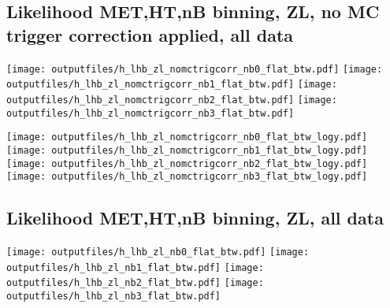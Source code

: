 \documentclass[11pt]{article}
\begin{document}



    \subsection{ Likelihood MET,HT,nB binning, ZL, no MC trigger correction applied, all data}

    \noindent
     \texttt{[image: outputfiles/h\_lhb\_zl\_nomctrigcorr\_nb0\_flat\_btw.pdf]}
     \texttt{[image: outputfiles/h\_lhb\_zl\_nomctrigcorr\_nb1\_flat\_btw.pdf]}
     \texttt{[image: outputfiles/h\_lhb\_zl\_nomctrigcorr\_nb2\_flat\_btw.pdf]}
     \texttt{[image: outputfiles/h\_lhb\_zl\_nomctrigcorr\_nb3\_flat\_btw.pdf]}

    \noindent
     \texttt{[image: outputfiles/h\_lhb\_zl\_nomctrigcorr\_nb0\_flat\_btw\_logy.pdf]}
     \texttt{[image: outputfiles/h\_lhb\_zl\_nomctrigcorr\_nb1\_flat\_btw\_logy.pdf]}
     \texttt{[image: outputfiles/h\_lhb\_zl\_nomctrigcorr\_nb2\_flat\_btw\_logy.pdf]}
     \texttt{[image: outputfiles/h\_lhb\_zl\_nomctrigcorr\_nb3\_flat\_btw\_logy.pdf]}

   \clearpage

    \subsection{ Likelihood MET,HT,nB binning, ZL, all data}

    \noindent
     \texttt{[image: outputfiles/h\_lhb\_zl\_nb0\_flat\_btw.pdf]}
     \texttt{[image: outputfiles/h\_lhb\_zl\_nb1\_flat\_btw.pdf]}
     \texttt{[image: outputfiles/h\_lhb\_zl\_nb2\_flat\_btw.pdf]}
     \texttt{[image: outputfiles/h\_lhb\_zl\_nb3\_flat\_btw.pdf]}
\end{document}
